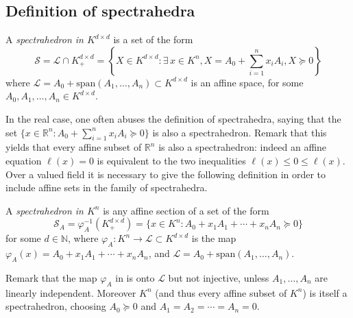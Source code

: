 \documentclass{elsarticle}
\theoremstyle{plain}
\theoremstyle{definition}
\renewcommand{\span}[1]{{\mathrm{span}(#1)}} %
\newcommand{\OK}{\mathcal{O}_K}
\begin{document}



\subsection{Definition of spectrahedra}

\begin{definition}
  \label{def_spectrahedra}
  A \emph{spectrahedron in $K^{d\times d}$} is a set of the form
  $$
  \mathcal{S} = \mathcal{L} \cap K^{d\times d}_+ = \left\{X \in K^{d \times d} :
  \exists \, x \in K^n, X = A_0 + \sum_{i=1}^n x_i A_i, X \succeq 0\right\}
  $$
  where $\mathcal{L} = A_0+\span{A_1,\ldots,A_n} \subset K^{d \times d}$ is an affine space, for some
  $A_0,A_1,\ldots,A_n \in K^{d\times d}$.
\end{definition}

In the real case, one often abuses the definition of spectrahedra, saying that the set
$\{x \in \mathbb{R}^n : A_0+\sum_{i=1}^n x_iA_i \succeq 0\}$ is also a spectrahedron.
Remark that this yields that every affine subset of $\mathbb{R}^n$ is also
a spectrahedron: indeed an affine equation $\ell(x) = 0$ is equivalent to the two inequalities
$\ell(x) \leq 0 \leq \ell(x)$. Over a valued field it is necessary to give the following
definition in order to include affine sets in the family of spectrahedra.

\begin{definition}
  \label{def_spectrahedra_Kn}
  A \emph{spectrahedron in $K^n$} is any affine section of a set of the form
  $$
  \mathcal{S}_A = \varphi_A^{-1}(K^{d \times d}_+) = \{x \in K^n : A_0+x_1A_1+\cdots+x_nA_n \succeq 0\}
  $$
  for some $d\in \mathbb{N}$,
  where $\varphi_A : K^n \to \mathcal{L} \subset K^{d \times d}$ is the map
  $\varphi_A(x) = A_0+x_1A_1+\cdots+x_nA_n$, and $\mathcal{L} = A_0+\span{A_1,\ldots,A_n}$.
\end{definition}

Remark that the map $\varphi_A$ in  is onto $\mathcal{L}$ but not
injective, unless $A_1,\ldots,A_n$ are linearly independent. Moreover $K^n$ (and thus every affine
subset of $K^n$) is itself a spectrahedron, choosing $A_0 \succeq 0$ and $A_1=A_2=\cdots=A_n=0$.
\end{document}
